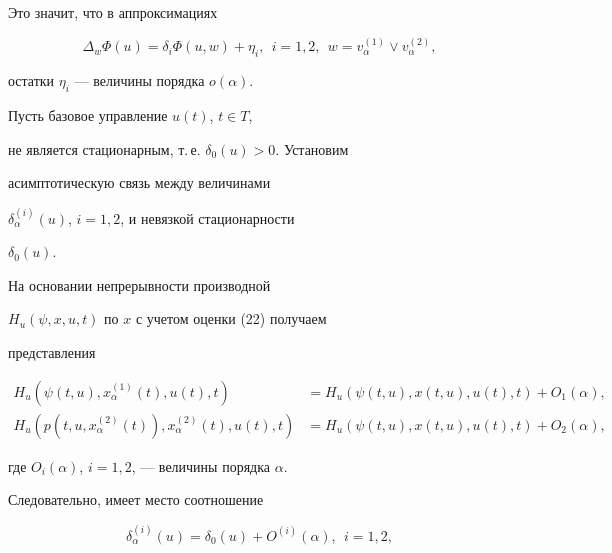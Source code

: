 Это значит, что в аппроксимациях


\begin{equation}


\Delta_{w}\Phi(u)=\delta_{i}\Phi(u,w)+\eta_{i},


\ \ i=1, 2,\ \ w=v_{\alpha}^{(1)} \vee v_{\alpha}^{(2)},


\end{equation}


остатки $\eta_{i}$ --- величины порядка $o(\alpha)$.





Пусть базовое управление $u(t)$, $t\in T$,


не является стационарным, т.\,е. $\delta_{0}(u)>0$. Установим


асимптотическую связь между величинами


$\delta_{\alpha}^{(i)}(u)$, $i=1, 2$, и невязкой стационарности


$\delta_{0}(u)$.





На основании непрерывности производной


$H_{u}(\psi, x, u, t)$ по $x$ с учетом оценки (22) получаем


представления


\begin{align*}


H_{u}(\psi(t,u), x_{\alpha}^{(1)}(t), u(t), t) &=


H_{u}(\psi(t,u), x(t,u), u(t), t)+O_{1}(\alpha),\\


H_{u}(p(t,u,x_{\alpha}^{(2)}(t)),x_{\alpha}^{(2)}(t), u(t), t)&=


H_{u}(\psi(t,u), x(t,u), u(t), t)+O_{2}(\alpha),


\end{align*}


где $O_{i}(\alpha)$, $i=1, 2$, --- величины порядка $\alpha$.





Следовательно, имеет место соотношение


\begin{equation}


\delta_{\alpha}^{(i)}(u)=\delta_{0}(u)+O^{(i)}(\alpha),


\ \ i=1, 2,


\end{equation}


